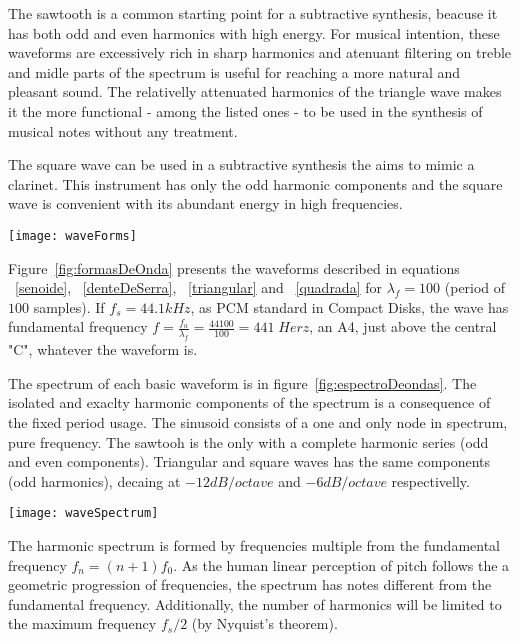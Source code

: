 \documentclass[
 aip,
 jmp,
 amsmath,amssymb,
 reprint,
]{revtex4-1}
\begin{document}
The sawtooth is a common starting point for a subtractive synthesis, beacuse it has both odd and even harmonics with high energy. For musical intention, these waveforms are excessively rich in sharp harmonics and atenuant filtering on treble and midle parts of the spectrum is useful for reaching a more natural and pleasant sound. 
The relativelly attenuated harmonics of the triangle wave makes it the more functional - among the listed ones - to be used in the synthesis of musical notes without any treatment.

The square wave can be used in a subtractive synthesis the aims to mimic a clarinet. This instrument has only the odd harmonic components and the square wave is convenient with its abundant energy in high frequencies.

\begin{figure*}
    \centering
        \texttt{[image: waveForms]}
    \caption{Basic musical waveforms. The synthetic  waveforms are in (a) and the real waveforms are in (b).}
        \label{fig:formasDeOnda}
\end{figure*}

Figure~\ref{fig:formasDeOnda} presents the waveforms described in equations  ~\ref{senoide}, ~\ref{denteDeSerra}, ~\ref{triangular} and ~\ref{quadrada} for $\lambda_f=100$ (period of $100$ samples). If $f_s=44.1kHz$, as PCM standard in Compact Disks, the wave has fundamental frequency $f=\frac{f_a}{\lambda_f}=\frac{44100}{100} = 441 \; Herz$, an A4, just above the central "C", whatever the waveform is.

The spectrum of each basic waveform is in figure~\ref{fig:espectroDeondas}. The isolated and exaclty harmonic components of the spectrum is a consequence of the fixed period usage. The sinusoid consists of a one and only node in spectrum, pure frequency. The sawtooh is the only with a complete harmonic series (odd and even components). Triangular and square waves has the same components (odd harmonics), decaing at $-12dB/octave$ and $-6dB/octave$ respectivelly.

\begin{figure*}
    \centering
        \texttt{[image: waveSpectrum]}
    \caption{Spectrum of basic artificial musical waveforms.}
        \label{fig:espectroDeOndas}
\end{figure*}

The harmonic spectrum is formed by frequencies multiple from the fundamental frequency $f_n=(n+1)f_0$. As the human linear perception of pitch follows the a geometric progression of frequencies, the spectrum has notes different from the fundamental frequency. Additionally, the number of harmonics will be limited to the maximum frequency $f_s/2$ (by Nyquist's theorem).
\end{document}
